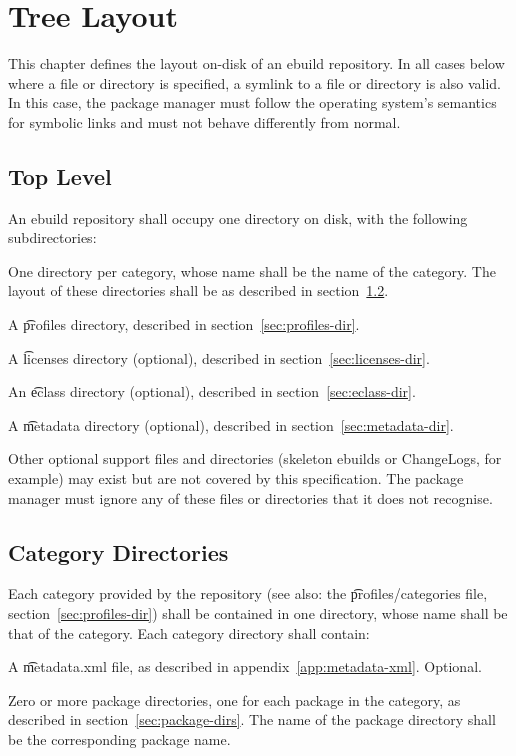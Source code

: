 \chapter{Tree Layout}

This chapter defines the layout on-disk of an ebuild repository. In all cases below where a file or
directory is specified, a symlink to a file or directory is also valid. In this case, the package
manager must follow the operating system's semantics for symbolic links and must not behave
differently from normal.

\section{Top Level}

An ebuild repository shall occupy one directory on disk, with the following subdirectories:
\nobreakpar
\begin{compactitem}
\item One directory per category, whose name shall be the name of the category. The layout of
    these directories shall be as described in section~\ref{sec:category-dirs}.
\item A \t{profiles} directory, described in section~\ref{sec:profiles-dir}.
\item A \t{licenses} directory (optional), described in section~\ref{sec:licenses-dir}.
\item An \t{eclass} directory (optional), described in section~\ref{sec:eclass-dir}.
\item A \t{metadata} directory (optional), described in section~\ref{sec:metadata-dir}.
\item Other optional support files and directories (skeleton ebuilds or ChangeLogs,
    for example) may exist but are not covered by this specification. The package manager must
    ignore any of these files or directories that it does not recognise.

\end{compactitem}

\section{Category Directories}
\label{sec:category-dirs}

Each category provided by the repository (see also: the \t{profiles/categories} file,
section~\ref{sec:profiles-dir}) shall be contained in one directory, whose name shall be that of
the category. Each category directory shall contain:
\begin{compactitem}
\item A \t{metadata.xml} file, as described in appendix~\ref{app:metadata-xml}\@. Optional.
\item Zero or more package directories, one for each package in the category, as described in
    section~\ref{sec:package-dirs}. The name of the package directory shall be the corresponding
    package name.
\end{compactitem}

